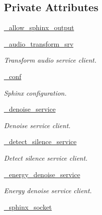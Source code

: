 \subsection*{Private Attributes}
\begin{DoxyCompactItemize}
\item 
\hyperlink{classrapp__speech__detection__sphinx4_1_1sphinx4__wrapper_1_1Sphinx4Wrapper_aabe3ea84bc3621edd386fc05cd397816}{\-\_\-allow\-\_\-sphinx\-\_\-output}
\item 
\hyperlink{classrapp__speech__detection__sphinx4_1_1sphinx4__wrapper_1_1Sphinx4Wrapper_adb28d10db0b145ae5607eefbfa07edd3}{\-\_\-audio\-\_\-transform\-\_\-srv}
\begin{DoxyCompactList}\small\item\em Transform audio service client. \end{DoxyCompactList}\item 
\hyperlink{classrapp__speech__detection__sphinx4_1_1sphinx4__wrapper_1_1Sphinx4Wrapper_a8b61ba8ea3e28ea8cb2317d1a83a2730}{\-\_\-conf}
\begin{DoxyCompactList}\small\item\em Sphinx configuration. \end{DoxyCompactList}\item 
\hyperlink{classrapp__speech__detection__sphinx4_1_1sphinx4__wrapper_1_1Sphinx4Wrapper_ad2e35b438312ce2396718371a9461597}{\-\_\-denoise\-\_\-service}
\begin{DoxyCompactList}\small\item\em Denoise service client. \end{DoxyCompactList}\item 
\hyperlink{classrapp__speech__detection__sphinx4_1_1sphinx4__wrapper_1_1Sphinx4Wrapper_a59c868f2dda79206d0a53650d93f6f8b}{\-\_\-detect\-\_\-silence\-\_\-service}
\begin{DoxyCompactList}\small\item\em Detect silence service client. \end{DoxyCompactList}\item 
\hyperlink{classrapp__speech__detection__sphinx4_1_1sphinx4__wrapper_1_1Sphinx4Wrapper_a72b86a6db9d93651c9202cb5cbf67c4b}{\-\_\-energy\-\_\-denoise\-\_\-service}
\begin{DoxyCompactList}\small\item\em Energy denoise service client. \end{DoxyCompactList}\item 
\hyperlink{classrapp__speech__detection__sphinx4_1_1sphinx4__wrapper_1_1Sphinx4Wrapper_a99f828ccad07d66025d905bb2f42e2a0}{\-\_\-sphinx\-\_\-socket}

\end{DoxyCompactItemize}
